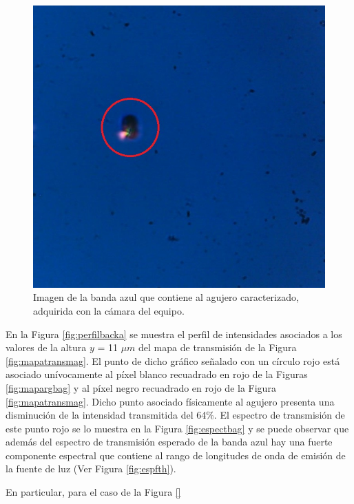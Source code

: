  \begin{figure}[H]
	\centering
	\includegraphics[scale=0.5]{Figs/microespectrometro/imagenagj.jpg}
	\caption{Imagen de la banda azul que contiene al agujero caracterizado, adquirida con la cámara del equipo.}
	\label{fig:agujeroimg}
\end{figure}


En la Figura \ref{fig:perfilbacka} se muestra el perfil de intensidades asociados a los valores de la altura $\textit{y}$ = 11 $\mu m$ del mapa de transmisión de la Figura \ref{fig:mapatransmag}. El punto de dicho gráfico señalado con un círculo rojo está asociado unívocamente al píxel blanco recuadrado en rojo de la Figuras \ref{fig:mapargbag} y al píxel negro recuadrado en rojo de la Figura \ref{fig:mapatransmag}. Dicho punto asociado físicamente al agujero presenta una disminución de la intensidad transmitida del 64\%. El espectro de transmisión de este punto rojo se lo muestra en la Figura \ref{fig:espectbag} y se puede observar que además del espectro de transmisión esperado de la banda azul hay una fuerte componente espectral que contiene al rango de longitudes de onda de emisión de la fuente de luz (Ver Figura \ref{fig:espfth}). 

En particular, para el caso de la Figura \ref{}

